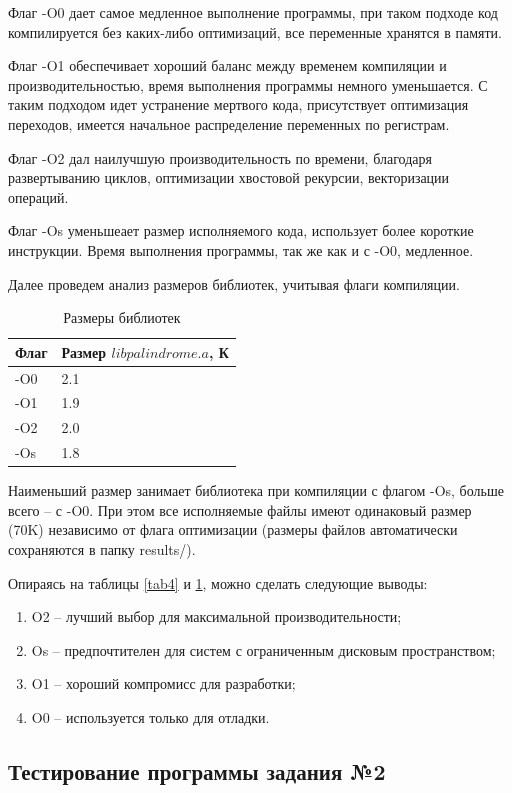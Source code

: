 \documentclass[14pt]{extreport}
\begin{document}
{Флаг -O0 дает самое медленное выполнение программы, при таком подходе код компилируется без каких-либо оптимизаций, все переменные хранятся в памяти.

Флаг -O1 обеспечивает хороший баланс между временем компиляции и производительностью, время выполнения программы немного уменьшается. С таким подходом идет устранение мертвого кода, присутствует оптимизация переходов, имеется начальное распределение переменных по регистрам.

Флаг -O2 дал наилучшую производительность по времени, благодаря развертыванию циклов, оптимизации хвостовой рекурсии, векторизации операций.

Флаг -Os уменьшеает размер исполняемого кода, использует более короткие инструкции. Время выполнения программы, так же как и с -O0, медленное.

Далее проведем анализ размеров библиотек, учитывая флаги компиляции.
\begin{table}[H]
\centering
\renewcommand{\tablename}{\small{Таблица.}}
\caption{\small Размеры библиотек }
\label{tab5}
\begin{tabular}{|p{4cm}|p{4cm}|}
    \hline
    Флаг & Размер $libpalindrome.a$, К \\
    \hline
    -O0 & 2.1 \\
    \hline
    -O1 & 1.9 \\
    \hline
    -O2 & 2.0 \\
    \hline
    -Os & 1.8 \\
    \hline
\end{tabular}
\end{table}
Наименьший размер занимает библиотека при компиляции с флагом -Os, больше всего -- с -O0.
При этом все исполняемые файлы имеют одинаковый размер (70K) независимо от флага оптимизации (размеры файлов автоматически сохраняются в папку results/).

Опираясь на таблицы \ref{tab4} и \ref{tab5}, можно сделать следующие выводы:
\begin{enumerate}
    \item O2 -- лучший выбор для максимальной производительности;
    \item Os -- предпочтителен для систем с ограниченным дисковым пространством;
    \item O1 -- хороший компромисс для разработки;
    \item O0 -- используется только для отладки.
\end{enumerate}
{\centering\subsection{Тестирование программы задания №2}}

}
\end{document}
